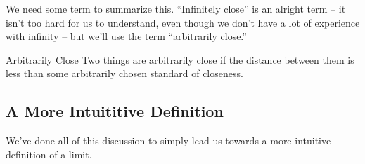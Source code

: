 We need some term to summarize this. ``Infinitely close'' is an alright term -- it isn't too hard for us to understand, even though we don't have a lot of experience with infinity -- but we'll use the term ``arbitrarily close.''

\begin{defn}{Arbitrarily Close}
  Two things are arbitrarily close if the distance between them is less than some arbitrarily chosen standard of closeness.
\end{defn}

\subsection*{A More Intuititive Definition}

We've done all of this discussion to simply lead us towards a more intuitive definition of a limit.
